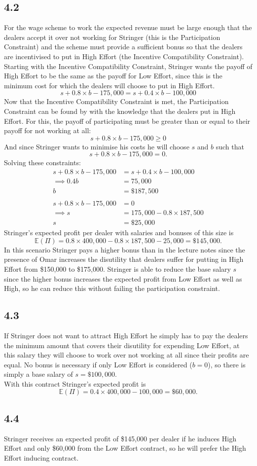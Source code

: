 \documentclass{article}
\begin{document}
\subsection*{4.2}
For the wage scheme to work the expected revenue must be large enough that the dealers accept it over not working for Stringer (this is the Participation Constraint) and the scheme must provide a sufficient bonus so that the dealers are incentivised to put in High Effort (the Incentive Compatibility Constraint).\\[2mm]
Starting with the Incentive Compatibility Constraint, Stringer wants the payoff of High Effort to be the same as the payoff for Low Effort, since this is the minimum cost for which the dealers will choose to put in High Effort.
$$s + 0.8 \times b - 175,000 = s + 0.4 \times b - 100,000$$
Now that the Incentive Compatibility Constraint is met, the Participation Constraint can be found by with the knowledge that the dealers put in High Effort. For this, the payoff of participating must be greater than or equal to their payoff for not working at all:
$$s + 0.8 \times b - 175,000 \geq 0$$
And since Stringer wants to minimise his costs he will choose $s$ and $b$ such that
$$s + 0.8 \times b - 175,000 = 0.$$
Solving these constraints:
\begin{align*}
    s + 0.8 \times b - 175,000 &= s + 0.4 \times b - 100,000\\
    \implies 0.4b &= 75,000\\
    b &= \$187,500\\
    \\
    s + 0.8 \times b - 175,000 &= 0\\
    \implies s &= 175,000 - 0.8 \times 187,500\\
    s &= \$25,000
\end{align*}
Stringer's expected profit per dealer with salaries and bonuses of this size is
$$\mathbb{E}(\Pi) = 0.8 \times 400,000 - 0.8 \times 187,500 - 25,000 = \$145,000.$$
In this scenario Stringer pays a higher bonus than in the lecture notes since the presence of Omar increases the disutility that dealers suffer for putting in High Effort from \$150,000 to \$175,000. Stringer is able to reduce the base salary $s$ since the higher bonus increases the expected profit from Low Effort as well as High, so he can reduce this without failing the participation constraint.

\subsection*{4.3}
If Stringer does not want to attract High Effort he simply has to pay the dealers the minimum amount that covers their disutility for expending Low Effort, at this salary they will choose to work over not working at all since their profits are equal. No bonus is necessary if only Low Effort is considered ($b = 0$), so there is simply a base salary of $s = \$100,000$.\\[2mm]
With this contract Stringer's expected profit is
$$\mathbb{E}(\Pi) = 0.4 \times 400,000 - 100,000 = \$60,000.$$

\subsection*{4.4}
Stringer receives an expected profit of \$145,000 per dealer if he induces High Effort and only \$60,000 from the Low Effort contract, so he will prefer the High Effort inducing contract.
\end{document}
